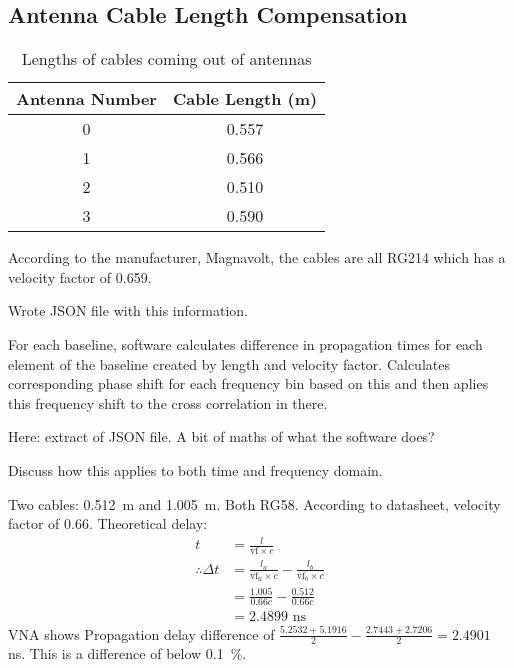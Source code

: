 \subsection{Antenna Cable Length Compensation}
\begin{table}
  \centering
  \begin{tabu}{c|c}
    Antenna Number & Cable Length (m)\\
     & 0.557 \\
    1 & 0.566 \\
    2 & 0.510 \\
    3 & 0.590
  \end{tabu}
  \caption{Lengths of cables coming out of antennas}
  \label{tab:software-antenna-cable-lengths}
\end{table}

According to the manufacturer, Magnavolt, the cables are all RG214 which has a velocity factor of 0.659. 

Wrote JSON file with this information.

For each baseline, software calculates difference in propagation times for each element of the baseline created by length and velocity factor. Calculates corresponding phase shift for each frequency bin based on this and then aplies this frequency shift to the cross correlation in there.

Here: extract of JSON file.
A bit of maths of what the software does?

Discuss how this applies to both time and frequency domain.

Two cables: \SI{0.512}{\meter} and \SI{1.005}{\meter}. Both RG58. According to datasheet, velocity factor of 0.66.
Theoretical delay:
\begin{equation}
  \begin{split}
    t &= \frac{l}{\text{vf} \times c}\\[1em]
  \therefore \Delta t &= \frac{l_a}{\text{vf}_a \times c} - \frac{l_b}{\text{vf}_b \times c} \\[1em]
                      &= \frac{1.005}{0.66c} - \frac{0.512}{0.66c} \\[1em]
    &= 2.4899 \text{ ns}
  \end{split}
\end{equation}
VNA shows Propagation delay difference of \(\frac{5.2532+5.1916}{2} - \frac{2.7443+2.7206}{2} = 2.4901\) ns. This is a difference of below \SI{0.1}{\percent}.

